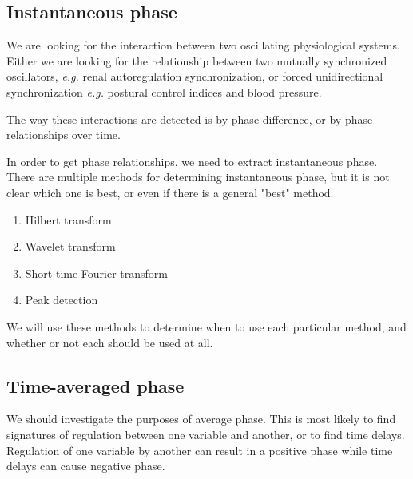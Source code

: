 \documentclass{article}
\begin{document}
\subsection*{Instantaneous phase}
We are looking for the interaction between two oscillating physiological systems. Either we are looking for the relationship between two mutually synchronized oscillators, \textit{e.g.} renal autoregulation synchronization, or forced unidirectional synchronization \textit{e.g.} postural control indices and blood pressure. 

The way these interactions are detected is by phase difference, or by phase relationships over time. 

In order to get phase relationships, we need to extract instantaneous phase. There are multiple methods for determining instantaneous phase, but it is not clear which one is best, or even if there is a general "best" method.
\begin{enumerate}
\item Hilbert transform
\item Wavelet transform
\item Short time Fourier transform
\item Peak detection
\end{enumerate}

We will use these methods to determine when to use each particular method, and whether or not each should be used at all.

\subsection*{Time-averaged phase}

We should investigate the purposes of average phase. This is most likely to find signatures of regulation between one variable and another, or to find time delays. Regulation of one variable by another can result in a positive phase while time delays can cause negative phase.
\end{document}

